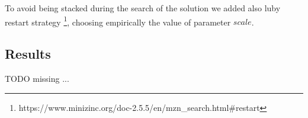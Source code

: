         To avoid being stacked during the search of the solution we added also luby restart strategy
        \footnote[2]{https://www.minizinc.org/doc-2.5.5/en/mzn\_search.html\#restart},
        choosing empirically
        the value of parameter $scale$.






\subsection{Results}
    \colorbox{BurntOrange}{TODO missing ...}


